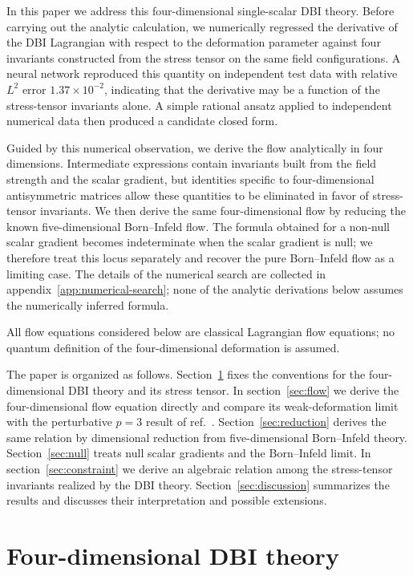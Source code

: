 \documentclass[a4paper,11pt]{article}
\numberwithin{equation}{section}
\begin{document}
In this paper we address this four-dimensional single-scalar DBI theory. Before carrying out the analytic calculation, we numerically regressed the derivative of the DBI Lagrangian with respect to the deformation parameter against four invariants constructed from the stress tensor on the same field configurations. A neural network reproduced this quantity on independent test data with relative $L^2$ error $1.37\times10^{-2}$, indicating that the derivative may be a function of the stress-tensor invariants alone. A simple rational ansatz applied to independent numerical data then produced a candidate closed form.

Guided by this numerical observation, we derive the flow analytically in four dimensions. Intermediate expressions contain invariants built from the field strength and the scalar gradient, but identities specific to four-dimensional antisymmetric matrices allow these quantities to be eliminated in favor of stress-tensor invariants. We then derive the same four-dimensional flow by reducing the known five-dimensional Born--Infeld flow. The formula obtained for a non-null scalar gradient becomes indeterminate when the scalar gradient is null; we therefore treat this locus separately and recover the pure Born--Infeld flow as a limiting case. The details of the numerical search are collected in appendix~\ref{app:numerical-search}; none of the analytic derivations below assumes the numerically inferred formula.

All flow equations considered below are classical Lagrangian flow equations; no quantum definition of the four-dimensional deformation is assumed.

The paper is organized as follows. Section~\ref{sec:dbi} fixes the conventions for the four-dimensional DBI theory and its stress tensor. In section~\ref{sec:flow} we derive the four-dimensional flow equation directly and compare its weak-deformation limit with the perturbative $p=3$ result of ref.~\cite{Blair2025}. Section~\ref{sec:reduction} derives the same relation by dimensional reduction from five-dimensional Born--Infeld theory. Section~\ref{sec:null} treats null scalar gradients and the Born--Infeld limit. In section~\ref{sec:constraint} we derive an algebraic relation among the stress-tensor invariants realized by the DBI theory. Section~\ref{sec:discussion} summarizes the results and discusses their interpretation and possible extensions.

\section{Four-dimensional DBI theory}
\label{sec:dbi}
\end{document}
